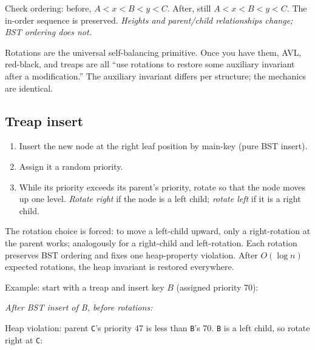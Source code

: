 \documentclass[11pt]{article}
\begin{document}
Check ordering: before, $A < x < B < y < C$. After, still $A < x < B < y < C$. The in-order sequence is preserved. \emph{Heights and parent/child relationships change; BST ordering does not.}

Rotations are the universal self-balancing primitive. Once you have them, AVL, red-black, and treaps are all ``use rotations to restore some auxiliary invariant after a modification.'' The auxiliary invariant differs per structure; the mechanics are identical.

\subsection*{Treap insert}

\begin{enumerate}[leftmargin=*]
    \item Insert the new node at the right leaf position by main-key (pure BST insert).
    \item Assign it a random priority.
    \item While its priority exceeds its parent's priority, rotate so that the node moves up one level. \emph{Rotate right} if the node is a left child; \emph{rotate left} if it is a right child.
\end{enumerate}

The rotation choice is forced: to move a left-child upward, only a right-rotation at the parent works; analogously for a right-child and left-rotation. Each rotation preserves BST ordering and fixes one heap-property violation. After $O(\log n)$ expected rotations, the heap invariant is restored everywhere.

Example: start with a treap and insert key $B$ (assigned priority 70):

\begin{center}
\emph{After BST insert of B, before rotations:}
\end{center}

Heap violation: parent \texttt{C}'s priority 47 is less than \texttt{B}'s 70. \texttt{B} is a left child, so rotate right at \texttt{C}:

\begin{center}
\end{center}
\end{document}

